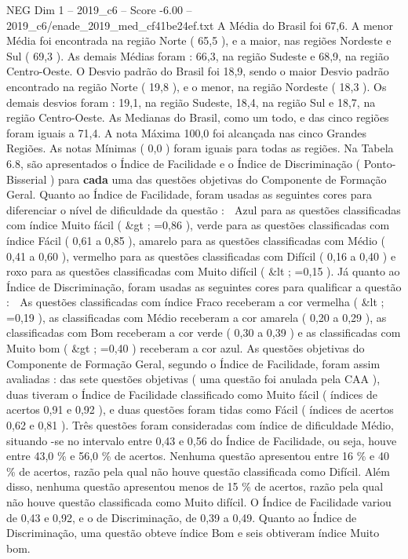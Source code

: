 \begin{textsample}{NEG Dim 1 – 2019\_c6 – Score -6.00 – 2019\_c6/enade\_2019\_med\_cf41be24ef.txt}
A Média do Brasil foi 67,6.
A menor Média foi encontrada na região Norte ( 65,5 ), e a maior, nas regiões Nordeste e Sul ( 69,3 ).
As demais Médias foram : 66,3, na região Sudeste e 68,9, na região Centro-Oeste.
O Desvio padrão do Brasil foi 18,9, sendo o maior Desvio padrão encontrado na região Norte ( 19,8 ), e o menor, na região Nordeste ( 18,3 ).
Os demais desvios foram : 19,1, na região Sudeste, 18,4, na região Sul e 18,7, na região Centro-Oeste.
As Medianas do Brasil, como um todo, e das cinco regiões foram iguais a 71,4.
A nota Máxima 100,0 foi alcançada nas cinco Grandes Regiões.
As notas Mínimas ( 0,0 ) foram iguais para todas as regiões.
Na Tabela 6.8, são apresentados o Índice de Facilidade e o Índice de Discriminação ( Ponto-Bisserial ) para \textbf{cada} uma das questões objetivas do Componente de Formação Geral.
Quanto ao Índice de Facilidade, foram usadas as seguintes cores para diferenciar o nível de dificuldade da questão :  Azul para as questões classificadas com índice Muito fácil ( \&gt ; =0,86 ), verde para as questões classificadas com índice Fácil ( 0,61 a 0,85 ), amarelo para as questões classificadas com Médio ( 0,41 a 0,60 ), vermelho para as questões classificadas com Difícil ( 0,16 a 0,40 ) e roxo para as questões classificadas com Muito difícil ( \&lt ; =0,15 ).
Já quanto ao Índice de Discriminação, foram usadas as seguintes cores para qualificar a questão :  As questões classificadas com índice Fraco receberam a cor vermelha ( \&lt ; =0,19 ), as classificadas com Médio receberam a cor amarela ( 0,20 a 0,29 ), as classificadas com Bom receberam a cor verde ( 0,30 a 0,39 ) e as classificadas com Muito bom ( \&gt ; =0,40 ) receberam a cor azul.
As questões objetivas do Componente de Formação Geral, segundo o Índice de Facilidade, foram assim avaliadas : das sete questões objetivas ( uma questão foi anulada pela CAA ), duas tiveram o Índice de Facilidade classificado como Muito fácil ( índices de acertos 0,91 e 0,92 ), e duas questões foram tidas como Fácil ( índices de acertos 0,62 e 0,81 ).
Três questões foram consideradas com índice de dificuldade Médio, situando -se no intervalo entre 0,43 e 0,56 do Índice de Facilidade, ou seja, houve entre 43,0 \% e 56,0 \% de acertos.
Nenhuma questão apresentou entre 16 \% e 40 \% de acertos, razão pela qual não houve questão classificada como Difícil.
Além disso, nenhuma questão apresentou menos de 15 \% de acertos, razão pela qual não houve questão classificada como Muito difícil.
O Índice de Facilidade variou de 0,43 e 0,92, e o de Discriminação, de 0,39 a 0,49.
Quanto ao Índice de Discriminação, uma questão obteve índice Bom e seis obtiveram índice Muito bom.

\end{textsample}
